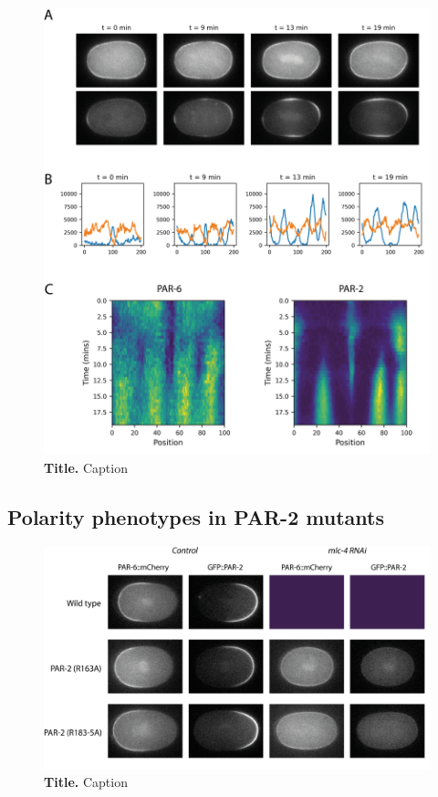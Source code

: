 \documentclass[12pt]{"article"}
\newcommand{\mycaption}[2]{\caption[#1]{\textbf{#1.} #2}}
\begin{document}
\begin{figure}[!h]
\includegraphics[scale=0.9]{uniform_polarity_sb}
\setlength{\abovecaptionskip}{20pt}
\centering
\mycaption{Title}{Caption}
\end{figure}

\clearpage
\subsection{Polarity phenotypes in PAR-2 mutants}

\begin{figure}[!h]
\includegraphics[scale=0.9]{uniform_polarity_mutants}
\setlength{\abovecaptionskip}{20pt}
\centering
\mycaption{Title}{Caption}
\end{figure}
\end{document}
